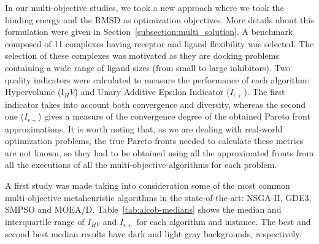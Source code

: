 In our multi-objective studies, we took a new approach where we took the binding energy and the RMSD as optimization objectives. More details about this formulation were given in Section~\ref{subsection:multi_solution}. A benchmark composed of 11 complexes having receptor and ligand flexibility was selected. The selection of these complexes was motivated as they are docking problems containing a wide range of ligand sizes (from small to large inhibitors). Two quality indicators were calculated to measure the performance of each algorithm: Hypervolume  (I$_HV$) and Unary Additive Epsilon Indicator ($I_{\epsilon+}$). The first indicator takes into account both convergence and diversity, whereas the second one ($I_{\epsilon+}$) gives a measure of the convergence degree of the obtained Pareto front approximations. It is worth noting that, as we are dealing with real-world optimization problems, the true Pareto fronts needed to calculate these metrics are not known, so they had to be obtained using all the approximated fronts from all the executions of all the multi-objective algorithms for each problem.

A first study was made taking into consideration some of the most common multi-objective metaheuristic algorithms in the state-of-the-art: NSGA-II, GDE3, SMPSO and MOEA/D. Table~\ref{tab:alcob-medians} shows the median and interquartile range of $I_{HV}$ and $I_{\epsilon+}$ for each algorithm and instance. The best and second best median results have dark and light gray backgrounds, respectively.

